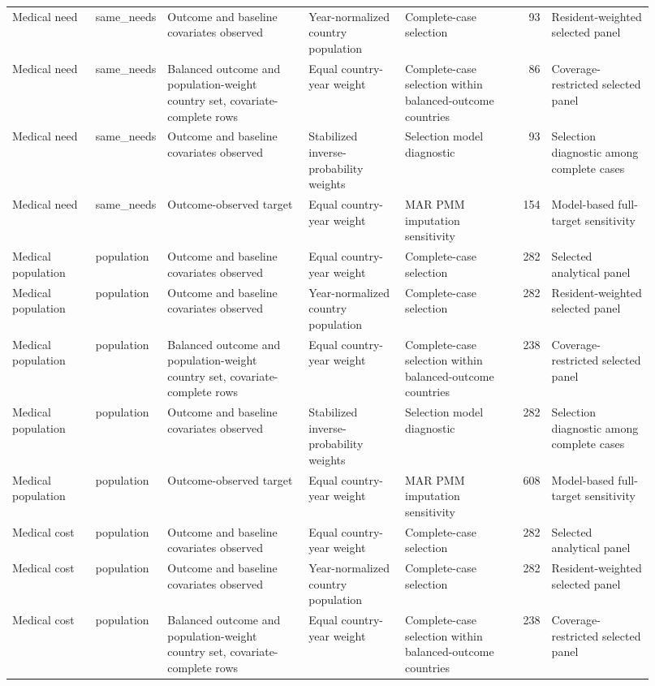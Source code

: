 \begin{tabular}{p{0.13\linewidth}p{0.08\linewidth}p{0.22\linewidth}p{0.15\linewidth}p{0.18\linewidth}rp{0.16\linewidth}}
Medical need & same\_needs & Outcome and baseline covariates observed & Year-normalized country population & Complete-case selection & 93 & Resident-weighted selected panel \\
Medical need & same\_needs & Balanced outcome and population-weight country set, covariate-complete rows & Equal country-year weight & Complete-case selection within balanced-outcome countries & 86 & Coverage-restricted selected panel \\
Medical need & same\_needs & Outcome and baseline covariates observed & Stabilized inverse-probability weights & Selection model diagnostic & 93 & Selection diagnostic among complete cases \\
Medical need & same\_needs & Outcome-observed target & Equal country-year weight & MAR PMM imputation sensitivity & 154 & Model-based full-target sensitivity \\
Medical population & population & Outcome and baseline covariates observed & Equal country-year weight & Complete-case selection & 282 & Selected analytical panel \\
Medical population & population & Outcome and baseline covariates observed & Year-normalized country population & Complete-case selection & 282 & Resident-weighted selected panel \\
Medical population & population & Balanced outcome and population-weight country set, covariate-complete rows & Equal country-year weight & Complete-case selection within balanced-outcome countries & 238 & Coverage-restricted selected panel \\
Medical population & population & Outcome and baseline covariates observed & Stabilized inverse-probability weights & Selection model diagnostic & 282 & Selection diagnostic among complete cases \\
Medical population & population & Outcome-observed target & Equal country-year weight & MAR PMM imputation sensitivity & 608 & Model-based full-target sensitivity \\
Medical cost & population & Outcome and baseline covariates observed & Equal country-year weight & Complete-case selection & 282 & Selected analytical panel \\
Medical cost & population & Outcome and baseline covariates observed & Year-normalized country population & Complete-case selection & 282 & Resident-weighted selected panel \\
Medical cost & population & Balanced outcome and population-weight country set, covariate-complete rows & Equal country-year weight & Complete-case selection within balanced-outcome countries & 238 & Coverage-restricted selected panel \\

\end{tabular}
